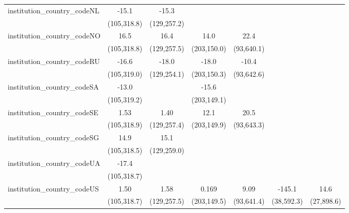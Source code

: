 \begin{tabular}{lcccccc}
   institution\_country\_codeNL          & -15.1         & -15.3         &               &               &              &   \\   
                                         & (105,318.8)   & (129,257.2)   &               &               &              &   \\   
   institution\_country\_codeNO          & 16.5          & 16.4          & 14.0          & 22.4          &              &   \\   
                                         & (105,318.8)   & (129,257.5)   & (203,150.0)   & (93,640.1)    &              &   \\   
   institution\_country\_codeRU          & -16.6         & -18.0         & -18.0         & -10.4         &              &   \\   
                                         & (105,319.0)   & (129,254.1)   & (203,150.3)   & (93,642.6)    &              &   \\   
   institution\_country\_codeSA          & -13.0         &               & -15.6         &               &              &   \\   
                                         & (105,319.2)   &               & (203,149.1)   &               &              &   \\   
   institution\_country\_codeSE          & 1.53          & 1.40          & 12.1          & 20.5          &              &   \\   
                                         & (105,318.9)   & (129,257.4)   & (203,149.9)   & (93,643.3)    &              &   \\   
   institution\_country\_codeSG          & 14.9          & 15.1          &               &               &              &   \\   
                                         & (105,318.5)   & (129,259.0)   &               &               &              &   \\   
   institution\_country\_codeUA          & -17.4         &               &               &               &              &   \\   
                                         & (105,318.7)   &               &               &               &              &   \\   
   institution\_country\_codeUS          & 1.50          & 1.58          & 0.169         & 9.09          & -145.1       & 14.6\\   
                                         & (105,318.7)   & (129,257.5)   & (203,149.5)   & (93,641.4)    & (38,592.3)   & (27,898.6)\\   

\end{tabular}
